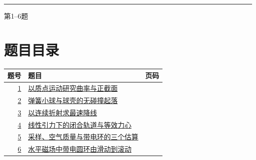 \documentclass[UTF8,fontset=fandol,a4paper,11pt]{ctexart}
\begin{document}

\thispagestyle{empty}\vspace*{22mm}

\par\vspace{12mm}

\par\vspace{12mm}

\par\vspace{9mm}

\noindent\textcolor{accent}{\rule{\linewidth}{1pt}}\par\vspace{9mm}

\noindent 第1--6题\par\vfill\clearpage

\section*{题目目录}

\begin{longtable}{@{}r p{113mm} r@{}}\toprule 题号 & 题目 & 页码\\\midrule

\hyperref[q:1]{1} & \hyperref[q:1]{以质点运动研究曲率与正截面} & \pageref{q:1} \\

\hyperref[q:2]{2} & \hyperref[q:2]{弹簧小球与球壳的无碰撞起落} & \pageref{q:2} \\

\hyperref[q:3]{3} & \hyperref[q:3]{以连续折射求最速降线} & \pageref{q:3} \\

\hyperref[q:4]{4} & \hyperref[q:4]{线性引力下的闭合轨道与等效力心} & \pageref{q:4} \\

\hyperref[q:5]{5} & \hyperref[q:5]{采样、空气质量与带电环的三个估算} & \pageref{q:5} \\

\hyperref[q:6]{6} & \hyperref[q:6]{水平磁场中带电圆环由滑动到滚动} & \pageref{q:6} \\

\bottomrule\end{longtable}

\clearpage
\end{document}
